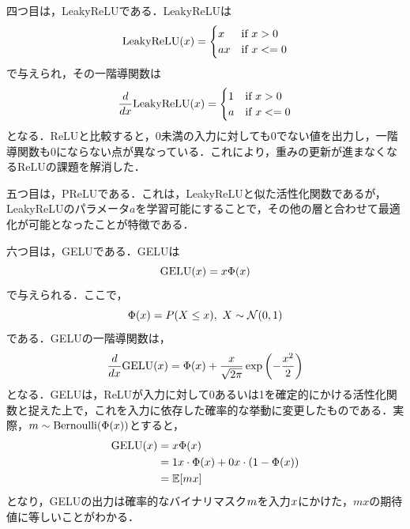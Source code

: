 \documentclass[12pt]{jarticle}
\numberwithin{equation}{section}    %
\numberwithin{figure}{section}      %
\numberwithin{table}{section}      %
\begin{document}
四つ目は，LeakyReLU\cite{maas2013rectifier}である．LeakyReLUは
\begin{equation}
    \text{LeakyReLU}(x) =
    \begin{cases}
        x  & \text{if $x > 0$}  \\
        ax & \text{if $x <= 0$}
    \end{cases}
\end{equation}
で与えられ，その一階導関数は
\begin{equation}
    \frac{d}{dx}\text{LeakyReLU}(x) =
    \begin{cases}
        1 & \text{if $x > 0$}  \\
        a & \text{if $x <= 0$}
    \end{cases}
\end{equation}
となる．ReLUと比較すると，0未満の入力に対しても0でない値を出力し，一階導関数も0にならない点が異なっている．これにより，重みの更新が進まなくなるReLUの課題を解消した．

五つ目は，PReLU\cite{he2015delving}である．これは，LeakyReLUと似た活性化関数であるが，LeakyReLUのパラメータ$a$を学習可能にすることで，その他の層と合わせて最適化が可能となったことが特徴である．

六つ目は，GELU\cite{hendrycks2016gaussian}である．GELUは
\begin{equation}
    \text{GELU}(x) = x \Phi(x)
\end{equation}
で与えられる．ここで，
\begin{equation}
    \Phi(x) = P(X \le x), ~ X \sim \mathcal{N} (0, 1)
\end{equation}
である．GELUの一階導関数は，
\begin{equation}
    \frac{d}{dx}\text{GELU}(x) = \Phi(x) + \frac{x}{\sqrt{2\pi}}\exp\left(-\frac{x^{2}}{2}\right)
\end{equation}
となる．GELUは，ReLUが入力に対して0あるいは1を確定的にかける活性化関数と捉えた上で，これを入力に依存した確率的な挙動に変更したものである．実際，$m \sim \text{Bernoulli}(\Phi(x))$とすると，
\begin{align}
    \text{GELU}(x) & = x \Phi(x)                                                       \\
                             & = 1 x \cdot \Phi(x) + 0 x \cdot (1 - \Phi(x)) \\
                             & = \mathbb{E} [mx]
\end{align}
となり，GELUの出力は確率的なバイナリマスク$m$を入力$x$にかけた，$mx$の期待値に等しいことがわかる．
\end{document}
